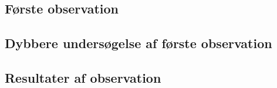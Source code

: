 \subsection{Første observation}
\label{sub:foerste_obs}

\subsection{Dybbere undersøgelse af første observation}
\label{sub:def_konflikt}

\subsection{Resultater af observation}
\label{sub:def_konflikt}
